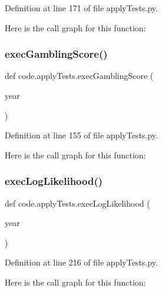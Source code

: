 Definition at line 171 of file apply\+Tests.\+py.

Here is the call graph for this function\+:
\mbox{\label{namespacecode_1_1apply_tests_a1c949f8a50fdd1e2c8d171a07329011c}} 
\subsubsection{\texorpdfstring{exec\+Gambling\+Score()}{execGamblingScore()}}
{\footnotesize\ttfamily def code.\+apply\+Tests.\+exec\+Gambling\+Score (\begin{DoxyParamCaption}\item[{}]{year }\end{DoxyParamCaption})}



Definition at line 155 of file apply\+Tests.\+py.

Here is the call graph for this function\+:
\mbox{\label{namespacecode_1_1apply_tests_a50007d1698c04b7f1f24ad1297bd275e}} 
\subsubsection{\texorpdfstring{exec\+Log\+Likelihood()}{execLogLikelihood()}}
{\footnotesize\ttfamily def code.\+apply\+Tests.\+exec\+Log\+Likelihood (\begin{DoxyParamCaption}\item[{}]{year }\end{DoxyParamCaption})}



Definition at line 216 of file apply\+Tests.\+py.

Here is the call graph for this function\+:
\mbox{\label{namespacecode_1_1apply_tests_aad827b9edb3d89c01c425b112267c8c2}} 
